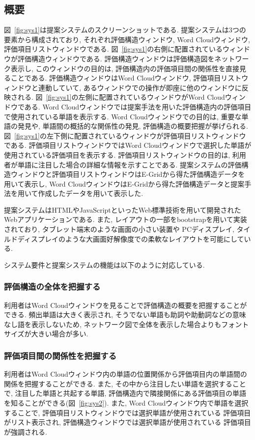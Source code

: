 \documentclass[syuuron]{kuee}
\begin{document}
		\subsection{概要}
			図~\ref{fig:sys1}は提案システムのスクリーンショットである. 
			提案システムは3つの要素から構成されており, それぞれ評価構造ウィンドウ, Word Cloudウィンドウ, 評価項目リストウィンドウである. 
			図~\ref{fig:sys1}の右側に配置されているウィンドウが評価構造ウィンドウである. 
			評価構造ウィンドウは評価構造図をネットワーク表示し, このウィンドウの目的は, 評価構造内の評価項目間の関係性を直接見ることである. 
			評価構造ウィンドウはWord Cloudウィンドウ, 評価項目リストウィンドウと連動していて, 
			あるウィンドウでの操作が即座に他のウィンドウに反映される. 
			図~\ref{fig:sys1}の左側に配置されているウィンドウがWord Cloudウィンドウである. 
			Word Cloudウィンドウでは提案手法を用いた評価構造内の評価項目で使用されている単語を表示する. 
			Word Cloudウィンドウでの目的は, 重要な単語の発見や, 単語間の概括的な関係性の発見, 評価構造の概要把握が挙げられる. 
			図~\ref{fig:sys1}の左下側に配置されているウィンドウが評価項目リストウィンドウである. 
			評価項目リストウィンドウではWord Cloudウィンドウで選択した単語が使用されている評価項目を表示する. 
			評価項目リストウィンドウの目的は, 利用者が単語に注目した場合の詳細な情報を示すことである. 
			提案システムの評価構造ウィンドウと評価項目リストウィンドウはE-Gridから得た評価構造データを用いて表示し, 
			Word CloudウィンドウはE-Gridから得た評価構造データと提案手法を用いて作成したデータを用いて表示した. 
			
			提案システムはHTMLやJavaScriptといったWeb標準技術を用いて開発されたWebアプリケーションである. 
			また, レイアウトの一部をbootstrapを用いて実装されており, タブレット端末のような画面の小さい装置や
			PCディスプレイ, タイルドディスプレイのような大画面好解像度での柔軟なレイアウトを可能にしている. 
			
			システム要件と提案システムの機能は以下のように対応している. 
			\subsubsection{評価構造の全体を把握する}
				利用者はWord Cloudウィンドウを見ることで評価構造の概要を把握することができる. 
				頻出単語は大きく表示され, そうでない単語も助詞や助動詞などの意味なし語を表示しないため, 
				ネットワーク図で全体を表示した場合よりもフォントサイズが大きい場合が多い. 				
			\subsubsection{評価項目間の関係性を把握する}
				利用者はWord Cloudウィンドウ内の単語の位置関係から評価項目内の単語間の関係を把握することができる. 
				また, その中から注目したい単語を選択することで, 注目した単語と共起する単語, 
				評価構造内で隣接関係にある評価項目の単語を知ることができる(図~\ref{fig:sys2}). 
				また, Word Cloudウィンドウ内で単語を選択することで, 評価項目リストウィンドウでは選択単語が使用されている
				評価項目がリスト表示され, 評価構造ウィンドウでは選択単語が使用されている
				評価項目が強調される. 
\end{document}
